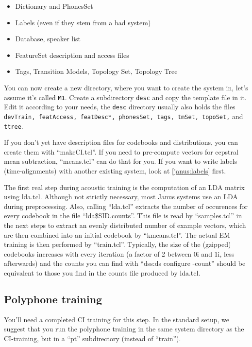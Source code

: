 \begin{itemize}
\item Dictionary and PhonesSet
\item Labels (even if they stem from a bad system)
\item Database, speaker list
\item FeatureSet description and access files
\item Tags, Transition Models, Topology Set, Topology Tree
\end{itemize}

You can   now create a  new directory,  where you want  to  create the
system in, let's assume it's   called {\tt M1}. Create a  subdirectory
{\tt  desc} and    copy the  template  file    in
it. Edit it according to your needs, the  {\tt desc} directory usually
also holds the  files {\tt devTrain, featAccess, featDesc*, phonesSet,
tags, tmSet, topoSet,} and {\tt ttree}.

If you  don't  yet     have  description  files  for  codebooks    and
distributions, you can create them with ``makeCI.tcl''. If you need to
pre-compute vectors for cepstral  mean subtraction,  ``means.tcl'' can
do that for  you. If you  want to write labels  (time-alignments) with
another existing system, look at \ref{janus:labels} first.

The first real step during acoustic training is  the computation of an
LDA matrix using lda.tcl. Although not  strictly necessary, most Janus
systems  use  an LDA during  preprocessing.  Also, calling ``lda.tcl''
extracts  the  number of occurences for  every   codebook in  the file
``lda\$SID.counts''. This file is read by  ``samples.tcl'' in the next
steps  to extract  an  evenly distributed  number of example  vectors,
which    are   then     combined  into   an    initial  codebook    by
``kmeans.tcl''.  The  actual   EM  training   is  then  performed   by
``train.tcl''.  Typically,    the  size of    the  (gzipped) codebooks
increases with every iteration (a factor of 2  between 0i and 1i, less
afterwards)  and  the counts  you  can find   with  ``dss:ds configure
-count'' should  be equivalent to  those  you find in  the counts file
produced by lda.tcl.

\subsection{Polyphone training} \label{janus:pt}

You'll need a  completed CI training for this  step.  In the  standard
setup,  we suggest  that you  run the  polyphone training in  the same
system  directory  as the CI-training,  but in   a ``pt'' subdirectory
(instead of ``train'').

